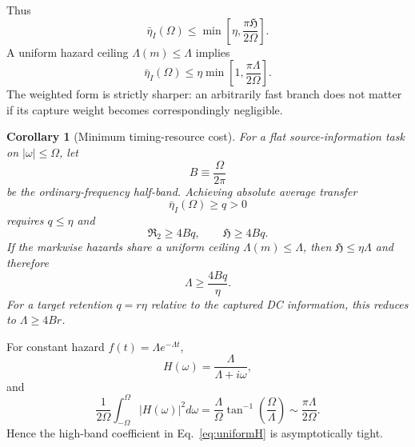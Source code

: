 \documentclass[aps,prapplied,preprint,nofootinbib]{revtex4-2}
\newtheorem{corollary}{Corollary}
\newcommand{\Rtwo}{\mathfrak R_2}
\newcommand{\Hcap}{\mathfrak H}
\begin{document}
Thus
\begin{equation}
\boxed{
\bar\eta_I(\Omega)
\le\min\left[\eta,\frac{\pi\Hcap}{2\Omega}\right].}
\label{eq:Hbound}
\end{equation}
A uniform hazard ceiling $\Lambda(m)\le\Lambda$ implies
\begin{equation}
\bar\eta_I(\Omega)\le
\eta\min\left[1,\frac{\pi\Lambda}{2\Omega}\right].
\label{eq:uniformH}
\end{equation}
The weighted form is strictly sharper: an arbitrarily fast branch does not matter if its capture weight becomes correspondingly negligible.

\begin{corollary}[Minimum timing-resource cost]
For a flat source-information task on $|\omega|\le\Omega$, let
\begin{equation}
B\equiv\frac{\Omega}{2\pi}
\end{equation}
be the ordinary-frequency half-band. Achieving absolute average transfer
\begin{equation}
\bar\eta_I(\Omega)\ge q>0
\end{equation}
requires $q\le\eta$ and
\begin{equation}
\boxed{\Rtwo\ge4Bq,\qquad \Hcap\ge4Bq.}
\label{eq:resourceCost}
\end{equation}
If the markwise hazards share a uniform ceiling $\Lambda(m)\le\Lambda$, then $\Hcap\le\eta\Lambda$ and therefore
\begin{equation}
\boxed{\Lambda\ge\frac{4Bq}{\eta}.}
\label{eq:uniformResourceCost}
\end{equation}
For a target retention $q=r\eta$ relative to the captured DC information, this reduces to $\Lambda\ge4Br$.
\end{corollary}

For constant hazard $f(t)=\Lambda e^{-\Lambda t}$,
\begin{equation}
H(\omega)=\frac{\Lambda}{\Lambda+i\omega},
\end{equation}
and
\begin{equation}
\frac{1}{2\Omega}\int_{-\Omega}^{\Omega}|H(\omega)|^2d\omega
=\frac{\Lambda}{\Omega}\tan^{-1}\!\left(\frac{\Omega}{\Lambda}\right)
\sim\frac{\pi\Lambda}{2\Omega}.
\end{equation}
Hence the high-band coefficient in Eq.~\eqref{eq:uniformH} is asymptotically tight.
\end{document}
